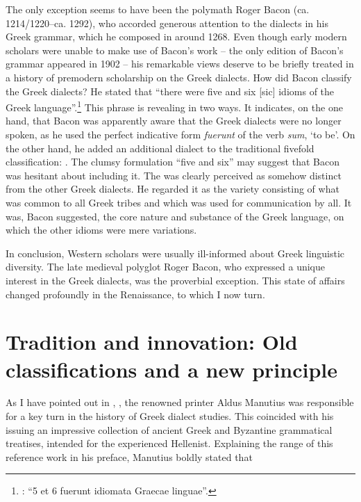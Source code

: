 The only exception seems to have been the  polymath Roger Bacon (ca. 1214/1220–ca. 1292), who accorded generous attention to the dialects in his Greek grammar, which he composed in  around 1268. Even though early modern scholars were unable to make use of Bacon’s work – the only edition of Bacon’s grammar appeared in 1902 – his remarkable views deserve to be briefly treated in a history of premodern scholarship on the Greek dialects. How did Bacon classify the Greek dialects? He stated that “there were five and six [sic] idioms of the Greek language”.\footnote{\citet[26]{Bacon1902}: “5 et 6 fuerunt idiomata Graecae linguae”.} This phrase is revealing in two ways. It indicates, on the one hand, that Bacon was apparently aware that the Greek dialects were no longer spoken, as he used the perfect indicative form \textit{fuerunt} of the  verb \textit{sum}, ‘to be’. On the other hand, he added an additional dialect to the traditional fivefold classification:  \citep[27]{Bacon1902}. The clumsy formulation “five and six” may suggest that Bacon was hesitant about including it. The  was clearly perceived as somehow distinct from the other Greek dialects. He regarded it as the variety consisting of what was common to all Greek tribes and which was used for communication by all. It was, Bacon suggested, the core nature and substance of the Greek language, on which the other idioms were mere variations.

In conclusion, Western scholars were usually ill-informed about Greek linguistic diversity. The late medieval polyglot Roger Bacon, who expressed a unique interest in the Greek dialects, was the proverbial exception. This state of affairs changed profoundly in the Renaissance, to which I now turn.

\section{Tradition and innovation: Old classifications and a new principle}\label{sec:2.6}

As I have pointed out in , , the renowned printer Aldus Manutius was responsible for a key turn in the history of Greek dialect studies. This coincided with his issuing an impressive collection of ancient Greek and Byzantine grammatical treatises, intended for the experienced Hellenist. Explaining the range of this reference work in his preface, Manutius boldly stated that

